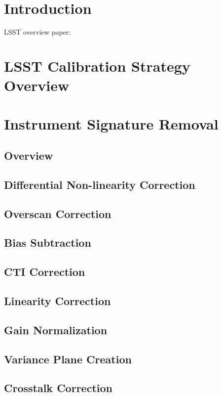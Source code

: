 \section{Introduction}

LSST overview paper: \cite{2008arXiv0805.2366I}

\section{LSST Calibration Strategy Overview}

\section{Instrument Signature Removal}
 
\subsection{Overview}
\subsection{Differential Non-linearity Correction}
\subsection{Overscan Correction}
\subsection{Bias Subtraction}
\subsection{CTI Correction}
\subsection{Linearity Correction}
\subsection{Gain Normalization}
\subsection{Variance Plane Creation}
\subsection{Crosstalk Correction}
